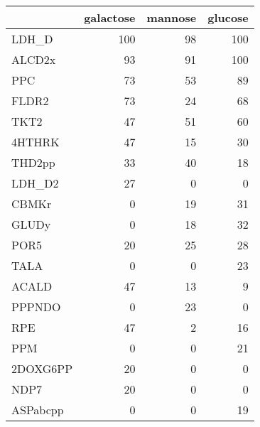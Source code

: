 \begin{tabular}{lrrr}
\toprule
{} &  galactose &  mannose &  glucose \\
\midrule
LDH\_D    & 100 & 98 & 100 \\
ALCD2x   & 93 & 91 & 100 \\
PPC      & 73 & 53 & 89 \\
FLDR2    & 73 & 24 & 68 \\
TKT2     & 47 & 51 & 60 \\
4HTHRK   & 47 & 15 & 30 \\
THD2pp   & 33 & 40 & 18 \\
LDH\_D2   & 27 & 0 & 0 \\
CBMKr    & 0 & 19 & 31 \\
GLUDy    & 0 & 18 & 32 \\
POR5     & 20 & 25 & 28 \\
TALA     & 0 & 0 & 23 \\
ACALD    & 47 & 13 & 9 \\
PPPNDO   & 0 & 23 & 0 \\
RPE      & 47 & 2 & 16 \\
PPM      & 0 & 0 & 21 \\
2DOXG6PP & 20 & 0 & 0 \\
NDP7     & 20 & 0 & 0 \\
ASPabcpp & 0 & 0 & 19 \\
\bottomrule
\end{tabular}
